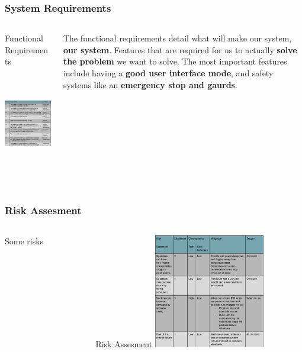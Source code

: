 \documentclass[aspectratio=169]{beamer}
\begin{document}
\begin{frame}
    \frametitle{System Requirements}

    \begin{columns}
        \begin{column}{0.48\textwidth}
            \begin{block}{Functional Requirements}
                \includegraphics[height=5cm]{FunctionalRequirements}
            \end{block}
        \end{column}

        \begin{column}{0.48\textwidth}
            The functional requirements detail what will make our system, \textbf{our system}. Features
            that are required for us to actually \textbf{solve the problem} we want to solve.
            The most important features include having a \textbf{good user interface mode}, and safety
            systems like an \textbf{emergency stop and gaurds}.
        \end{column}
    \end{columns}
\end{frame}

\begin{frame}
    \frametitle{Risk Assesment}

    \begin{columns}
        \begin{column}{0.48\textwidth}
            Some risks
        \end{column}

        \begin{column}{0.48\textwidth}
            \begin{block}{Risk Assesment}
                \includegraphics[height=5cm]{RiskAssesment}
            \end{block}
        \end{column}
    \end{columns}
\end{frame}
\end{document}
